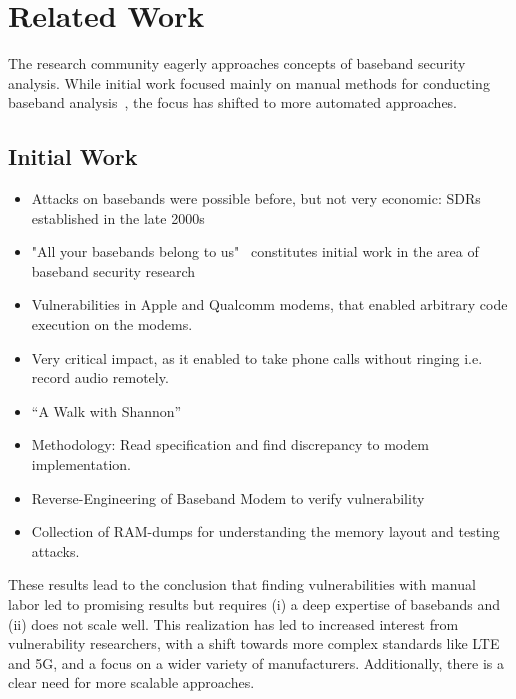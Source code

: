 \chapter{Related Work}

The research community eagerly approaches concepts of baseband security analysis.
While initial work focused mainly on manual methods for conducting baseband analysis~\cite{}, the focus has shifted to more automated approaches.

\section{Initial Work}

\begin{itemize}
  \item Attacks on basebands were possible before, but not very economic: SDRs established in the late 2000s
  \item "All your basebands belong to us"~\cite{Weinmann10} constitutes initial work in the area of baseband security research
  \item Vulnerabilities in Apple and Qualcomm modems, that enabled arbitrary code execution on the modems. 
  \item Very critical impact, as it enabled to take phone calls without ringing i.e. record audio remotely.
\end{itemize}

\begin{itemize}
  \item \enquote{A Walk with Shannon}~\cite{Cama18}
  \item Methodology: Read specification and find discrepancy to modem implementation.
  \item Reverse-Engineering of Baseband Modem to verify vulnerability
  \item Collection of RAM-dumps for understanding the memory layout and testing attacks.
\end{itemize}

These results lead to the conclusion that finding vulnerabilities with manual labor led to promising results but requires (i) a deep expertise of basebands and (ii) does not scale well.
This realization has led to increased interest from vulnerability researchers, with a shift towards more complex standards like LTE and 5G, and a focus on a wider variety of manufacturers. 
Additionally, there is a clear need for more scalable approaches.

